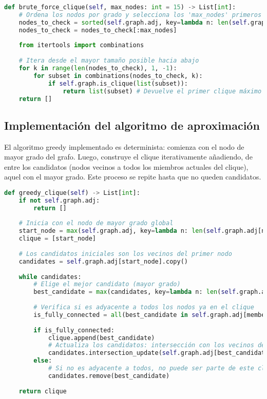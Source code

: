 \documentclass[12pt,a4paper]{report}
\begin{document}
\begin{lstlisting}[language=Python, caption={Fragmento del algoritmo de fuerza bruta}]
def brute_force_clique(self, max_nodes: int = 15) -> List[int]:
    # Ordena los nodos por grado y selecciona los 'max_nodes' primeros
    nodes_to_check = sorted(self.graph.adj, key=lambda n: len(self.graph.adj[n]), reverse=True)
    nodes_to_check = nodes_to_check[:max_nodes]
    
    from itertools import combinations
    
    # Itera desde el mayor tamaño posible hacia abajo
    for k in range(len(nodes_to_check), 1, -1):
        for subset in combinations(nodes_to_check, k):
            if self.graph.is_clique(list(subset)):
                return list(subset) # Devuelve el primer clique máximo encontrado
    return []
\end{lstlisting}

\subsection{Implementación del algoritmo de aproximación}
El algoritmo greedy implementado es determinista: comienza con el nodo de mayor grado del grafo. Luego, construye el clique iterativamente añadiendo, de entre los candidatos (nodos vecinos a todos los miembros actuales del clique), aquel con el mayor grado. Este proceso se repite hasta que no queden candidatos.

\begin{lstlisting}[language=Python, caption={Fragmento del algoritmo greedy}]
def greedy_clique(self) -> List[int]:
    if not self.graph.adj:
        return []
    
    # Inicia con el nodo de mayor grado global
    start_node = max(self.graph.adj, key=lambda n: len(self.graph.adj[n]))
    clique = [start_node]
    
    # Los candidatos iniciales son los vecinos del primer nodo
    candidates = self.graph.adj[start_node].copy()
    
    while candidates:
        # Elige el mejor candidato (mayor grado)
        best_candidate = max(candidates, key=lambda n: len(self.graph.adj[n]))
        
        # Verifica si es adyacente a todos los nodos ya en el clique
        is_fully_connected = all(best_candidate in self.graph.adj[member] for member in clique)
        
        if is_fully_connected:
            clique.append(best_candidate)
            # Actualiza los candidatos: intersección con los vecinos del nuevo miembro
            candidates.intersection_update(self.graph.adj[best_candidate])
        else:
            # Si no es adyacente a todos, no puede ser parte de este clique
            candidates.remove(best_candidate)
            
    return clique
\end{lstlisting}
\end{document}
